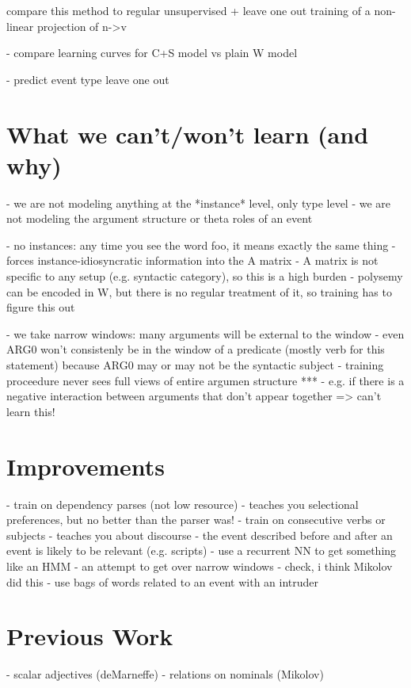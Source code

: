 \documentclass[11pt,letterpaper]{article}
\begin{document}
	compare this method to regular unsupervised + leave one out training of a non-linear projection of n->v

- compare learning curves for C+S model vs plain W model

- predict event type leave one out




\section{What we can't/won't learn (and why)} %
\label{section:unlearnability}
- we are not modeling anything at the *instance* level, only type level
- we are not modeling the argument structure or theta roles of an event

- no instances: any time you see the word foo, it means exactly the same thing
	- forces instance-idiosyncratic information into the A matrix
	- A matrix is not specific to any setup (e.g. syntactic category), so this is a high burden
	- polysemy can be encoded in W, but there is no regular treatment of it, so training has to figure this out

- we take narrow windows: many arguments will be external to the window
	- even ARG0 won't consistenly be in the window of a predicate (mostly verb for this statement)
		because ARG0 may or may not be the syntactic subject
	- training proceedure never sees full views of entire argumen structure
	***	- e.g. if there is a negative interaction between arguments that don't appear together => can't learn this!


\section{Improvements}
- train on dependency parses (not low resource)
	- teaches you selectional preferences, but no better than the parser was!
- train on consecutive verbs or subjects
	- teaches you about discourse
	- the event described before and after an event is likely to be relevant (e.g. scripts)
- use a recurrent NN to get something like an HMM
	- an attempt to get over narrow windows
	- check, i think Mikolov did this
- use bags of words related to an event with an intruder


\section{Previous Work} %
- scalar adjectives (deMarneffe)
- relations on nominals (Mikolov)
\end{document}
